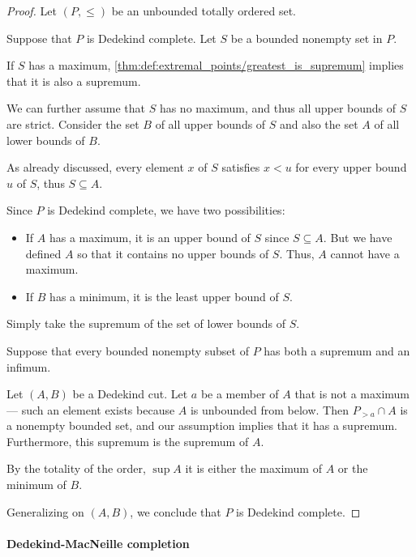 \begin{proof}
  Let \( (P, \leq) \) be an unbounded totally ordered set.

  \SufficiencySubProof Suppose that \( P \) is Dedekind complete. Let \( S \) be a bounded nonempty set in \( P \).

   If \( S \) has a maximum, \cref{thm:def:extremal_points/greatest_is_supremum} implies that it is also a supremum.

  We can further assume that \( S \) has no maximum, and thus all upper bounds of \( S \) are strict. Consider the set \( B \) of all upper bounds of \( S \) and also the set \( A \) of all  lower bounds of \( B \).

  As already discussed, every element \( x \) of \( S \) satisfies \( x < u \) for every upper bound \( u \) of \( S \), thus \( S \subseteq A \).

  Since \( P \) is Dedekind complete, we have two possibilities:
  \begin{itemize}
    \item If \( A \) has a maximum, it is an upper bound of \( S \) since \( S \subseteq A \). But we have defined \( A \) so that it contains no upper bounds of \( S \). Thus, \( A \) cannot have a maximum.

    \item If \( B \) has a minimum, it is the least upper bound of \( S \).
  \end{itemize}

   Simply take the supremum of the set of lower bounds of \( S \).

  \NecessitySubProof Suppose that every bounded nonempty subset of \( P \) has both a supremum and an infimum.

  Let \( (A, B) \) be a Dedekind cut. Let \( a \) be a member of \( A \) that is not a maximum --- such an element exists because \( A \) is unbounded from below. Then \( P_{>a} \cap A \) is a nonempty bounded set, and our assumption implies that it has a supremum. Furthermore, this supremum is the supremum of \( A \).

  By the totality of the order, \( \sup A \) it is either the maximum of \( A \) or the minimum of \( B \).

  Generalizing on \( (A, B) \), we conclude that \( P \) is Dedekind complete.
\end{proof}

\paragraph{Dedekind-MacNeille completion}


